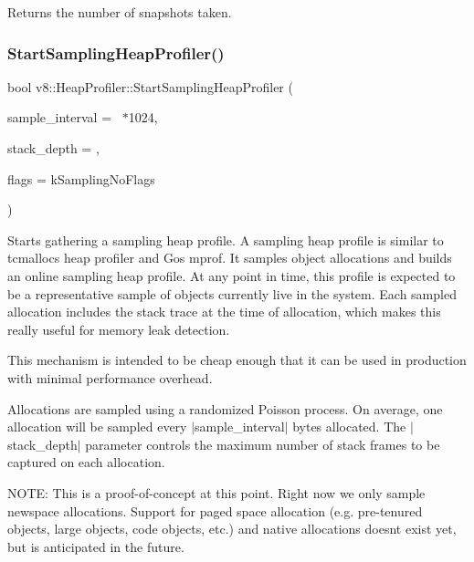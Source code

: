 Returns the number of snapshots taken. \mbox{\label{classv8_1_1HeapProfiler_a6b9450bbf1f4e1a4909df92d4df4a174}} 
\subsubsection{\texorpdfstring{Start\+Sampling\+Heap\+Profiler()}{StartSamplingHeapProfiler()}}
{\footnotesize\ttfamily bool v8\+::\+Heap\+Profiler\+::\+Start\+Sampling\+Heap\+Profiler (\begin{DoxyParamCaption}\item[{uint64\+\_\+t}]{sample\+\_\+interval = {~$\ast$1024},  }\item[{int}]{stack\+\_\+depth = {},  }\item[{Sampling\+Flags}]{flags = {\ttfamily kSamplingNoFlags} }\end{DoxyParamCaption})}

Starts gathering a sampling heap profile. A sampling heap profile is similar to tcmalloc\textquotesingle{}s heap profiler and Go\textquotesingle{}s mprof. It samples object allocations and builds an online \textquotesingle{}sampling\textquotesingle{} heap profile. At any point in time, this profile is expected to be a representative sample of objects currently live in the system. Each sampled allocation includes the stack trace at the time of allocation, which makes this really useful for memory leak detection.

This mechanism is intended to be cheap enough that it can be used in production with minimal performance overhead.

Allocations are sampled using a randomized Poisson process. On average, one allocation will be sampled every $\vert$sample\+\_\+interval$\vert$ bytes allocated. The $\vert$stack\+\_\+depth$\vert$ parameter controls the maximum number of stack frames to be captured on each allocation.

N\+O\+TE\+: This is a proof-\/of-\/concept at this point. Right now we only sample newspace allocations. Support for paged space allocation (e.\+g. pre-\/tenured objects, large objects, code objects, etc.) and native allocations doesn\textquotesingle{}t exist yet, but is anticipated in the future.


